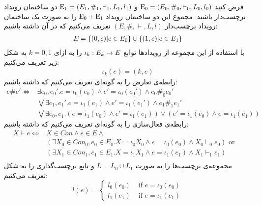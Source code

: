 \begin{definition}
    فرض کنید
    $\mathrm{E}_0 = (E_0,\#_0,\vdash_0,L_0,l_0)$
    و
    $\mathrm{E}_1 = (E_1,\#_1,\vdash_1,L_1,l_1)$
    دو ساختمان رویداد برچسب‌دار باشند.
    مجموع این دو ساختمان رویداد
    $\mathrm{E}_0 + \mathrm{E}_1$
    را به صورت یک ساختمان رویداد برچسب‌دار
    $(E,\#,\vdash,L,l)$
    تعریف می‌کنیم که در آن داشته باشیم:
    \begin{align*}
        E = \{(0,e)|e \in E_0\} \cup \{(1,e)|e \in E_1\}
    \end{align*}
    با استفاده از این مجموعه از رویداد‌ها توابع
    $\iota_k: E_k \rightarrow E$
    را به ازای
    $k=0,1$
    به شکل زیر تعریف می‌کنیم:
    \begin{align*}
        \iota_k(e) = (k,e)
    \end{align*}
    رابطه‌ی تعارض را به گونه‌ای تعریف می‌کنیم که داشته باشیم:
    \begin{align*}
        e \# e' \iff & \exists e_0,e_0'. e = \iota_0(e_0)
        \wedge e' = \iota_0(e_0') \wedge e_0 \#_0e_0'             \\
                     & \bigvee \exists e_1,e_1'. e = \iota_1(e_1)
        \wedge e' = \iota_1(e_1') \wedge e_1 \#_1 e_1'            \\
                     & \bigvee \exists e_0,e_1.(e=\iota_1(e_0)
        \wedge e' =\iota_1(e_1)) \vee
        (e'=\iota_1(e_0) \wedge e =\iota_1(e_1))
    \end{align*}
    رابطه‌ی فعال‌سازی را به گونه‌ای تعریف می‌کنیم که داشته باشیم:
    \begin{align*}
        X \vdash e \iff & X \in Con \wedge e \in E \wedge                   & \\
                        & (\exists X_0 \in Con_0,e_0 \in E_0.X = \iota_0X_0
        \wedge e = \iota_0(e_0) \wedge X_0 \vdash_0 e_0) \text{ or }          \\
                        & (\exists X_1 \in Con_1,e_1 \in E_1.X = \iota_1X_1
        \wedge e = \iota_1(e_1) \wedge X_1 \vdash_1 e_1)                      \\
    \end{align*}
     مجموعه‌ی برچسب‌ها را به صورت
    $L = L_0 \cup L_1$
    و تابع برچسب‌گذاری را به شکل تعریف می‌کنیم:
    $$
        l(e) = \begin{cases}
            l_0(e_0) & \text{ if } e = \iota_0(e_0) \\
            l_1(e_1) & \text{ if } e = \iota_1(e_1)
        \end{cases}
    $$
\end{definition}

